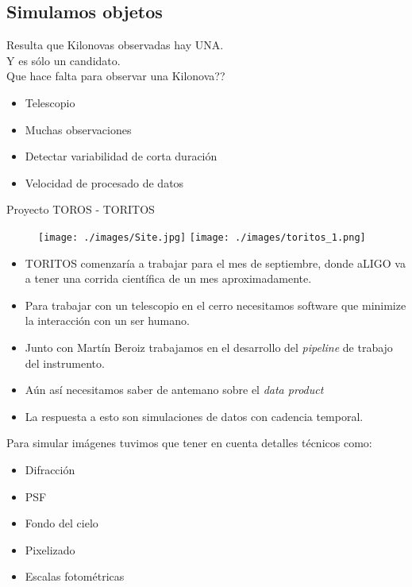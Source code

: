 \documentclass[10pt]{beamer}
\begin{document}
\subsection{Simulamos objetos}
\begin{frame}
 Resulta que Kilonovas observadas hay UNA.\\ 
 Y es s\'olo un candidato. \\
 Que hace falta para observar una Kilonova??
 \begin{itemize}[<+->]
  \item Telescopio
  \item Muchas observaciones
  \item Detectar variabilidad de corta duraci\'on
  \item Velocidad de procesado de datos
 \end{itemize}
 \pause
 Proyecto TOROS - TORITOS
\begin{figure}
 \centering
 \texttt{[image: ./images/Site.jpg]}
 \texttt{[image: ./images/toritos\_1.png]}
\end{figure}
\end{frame}
\begin{frame}
 \begin{itemize}
  \item TORITOS comenzar\'{i}a a trabajar para el mes de septiembre, 
 donde aLIGO va a tener una corrida cient\'{i}fica de un mes aproximadamente.
 \item Para trabajar con un telescopio en el cerro necesitamos software que minimize la interacci\'on
 con un ser humano.
 \item  Junto con Mart\'{i}n Beroiz trabajamos en el desarrollo del \textit{pipeline} de 
 trabajo del instrumento.
 \item A\'un as\'{i} necesitamos saber de antemano sobre el \textit{data product} \pause
 \item La respuesta a esto son simulaciones de datos con cadencia temporal.
 \end{itemize}
\end{frame}
\begin{frame}
Para simular im\'agenes tuvimos que tener en cuenta detalles t\'ecnicos como:
\begin{itemize}%
 \item Difracci\'on
 \item PSF
 \item Fondo del cielo
 \item Pixelizado
 \item Escalas fotom\'etricas
\end{itemize}
\end{frame}
\end{document}
